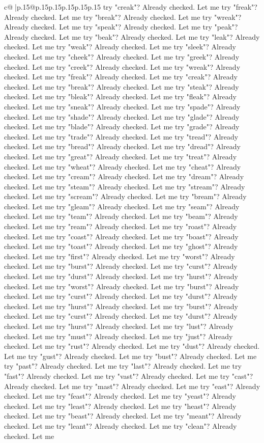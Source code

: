 \documentclass{article}
\begin{document}
{\begin{supertabular}{c@{$\;$}|p{.15\linewidth}@{}p{.15\linewidth}p{.15\linewidth}p{.15\linewidth}p{.15\linewidth}p{.15\linewidth}}
{{{try "creak"? Already checked. Let me try "freak"? Already checked. Let me try "break"? Already checked. Let me try "wreak"? Already checked. Let me try "speak"? Already checked. Let me try "peak"? Already checked. Let me try "beak"? Already checked. Let me try "leak"? Already checked. Let me try "weak"? Already checked. Let me try "sleek"? Already checked. Let me try "cheek"? Already checked. Let me try "greek"? Already checked. Let me try "creek"? Already checked. Let me try "wreak"? Already checked. Let me try "freak"? Already checked. Let me try "creak"? Already checked. Let me try "break"? Already checked. Let me try "steak"? Already checked. Let me try "bleak"? Already checked. Let me try "fleak"? Already checked. Let me try "sneak"? Already checked. Let me try "spade"? Already checked. Let me try "shade"? Already checked. Let me try "glade"? Already checked. Let me try "blade"? Already checked. Let me try "grade"? Already checked. Let me try "trade"? Already checked. Let me try "tread"? Already checked. Let me try "bread"? Already checked. Let me try "dread"? Already checked. Let me try "great"? Already checked. Let me try "treat"? Already checked. Let me try "wheat"? Already checked. Let me try "cheat"? Already checked. Let me try "cream"? Already checked. Let me try "dream"? Already checked. Let me try "steam"? Already checked. Let me try "stream"? Already checked. Let me try "scream"? Already checked. Let me try "bream"? Already checked. Let me try "gleam"? Already checked. Let me try "seam"? Already checked. Let me try "team"? Already checked. Let me try "beam"? Already checked. Let me try "ream"? Already checked. Let me try "roast"? Already checked. Let me try "coast"? Already checked. Let me try "boast"? Already checked. Let me try "toast"? Already checked. Let me try "ghost"? Already checked. Let me try "first"? Already checked. Let me try "worst"? Already checked. Let me try "burst"? Already checked. Let me try "curst"? Already checked. Let me try "durst"? Already checked. Let me try "hurst"? Already checked. Let me try "worst"? Already checked. Let me try "burst"? Already checked. Let me try "curst"? Already checked. Let me try "durst"? Already checked. Let me try "hurst"? Already checked. Let me try "burst"? Already checked. Let me try "curst"? Already checked. Let me try "durst"? Already checked. Let me try "hurst"? Already checked. Let me try "lust"? Already checked. Let me try "must"? Already checked. Let me try "just"? Already checked. Let me try "rust"? Already checked. Let me try "dust"? Already checked. Let me try "gust"? Already checked. Let me try "bust"? Already checked. Let me try "past"? Already checked. Let me try "last"? Already checked. Let me try "fast"? Already checked. Let me try "vast"? Already checked. Let me try "cast"? Already checked. Let me try "mast"? Already checked. Let me try "east"? Already checked. Let me try "feast"? Already checked. Let me try "yeast"? Already checked. Let me try "least"? Already checked. Let me try "heast"? Already checked. Let me try "beast"? Already checked. Let me try "meant"? Already checked. Let me try "leant"? Already checked. Let me try "clean"? Already checked. Let me }}}
\end{supertabular}}
\end{document}
